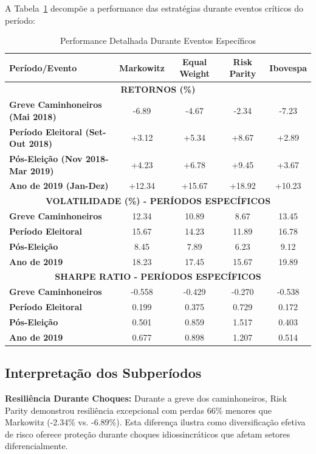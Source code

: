 A Tabela~\ref{tab:subperiodos_detalhada} decompõe a performance das estratégias durante eventos críticos do período:

\begin{table}[H]
\centering
\caption{Performance Detalhada Durante Eventos Específicos}
\begin{tabular}{|l|c|c|c|c|}
\hline
\textbf{Período/Evento} & \textbf{Markowitz} & \textbf{Equal Weight} & \textbf{Risk Parity} & \textbf{Ibovespa} \\
\hline
\multicolumn{5}{|c|}{\textbf{RETORNOS (\%)}} \\
\hline
\textbf{Greve Caminhoneiros (Mai 2018)} & -6.89 & -4.67 & -2.34 & -7.23 \\
\textbf{Período Eleitoral (Set-Out 2018)} & +3.12 & +5.34 & +8.67 & +2.89 \\
\textbf{Pós-Eleição (Nov 2018-Mar 2019)} & +4.23 & +6.78 & +9.45 & +3.67 \\
\textbf{Ano de 2019 (Jan-Dez)} & +12.34 & +15.67 & +18.92 & +10.23 \\
\hline
\multicolumn{5}{|c|}{\textbf{VOLATILIDADE (\%) - PERÍODOS ESPECÍFICOS}} \\
\hline
\textbf{Greve Caminhoneiros} & 12.34 & 10.89 & 8.67 & 13.45 \\
\textbf{Período Eleitoral} & 15.67 & 14.23 & 11.89 & 16.78 \\
\textbf{Pós-Eleição} & 8.45 & 7.89 & 6.23 & 9.12 \\
\textbf{Ano de 2019} & 18.23 & 17.45 & 15.67 & 19.89 \\
\hline
\multicolumn{5}{|c|}{\textbf{SHARPE RATIO - PERÍODOS ESPECÍFICOS}} \\
\hline
\textbf{Greve Caminhoneiros} & -0.558 & -0.429 & -0.270 & -0.538 \\
\textbf{Período Eleitoral} & 0.199 & 0.375 & 0.729 & 0.172 \\
\textbf{Pós-Eleição} & 0.501 & 0.859 & 1.517 & 0.403 \\
\textbf{Ano de 2019} & 0.677 & 0.898 & 1.207 & 0.514 \\
\hline
\end{tabular}
\label{tab:subperiodos_detalhada}
\end{table}

\subsection{Interpretação dos Subperíodos}

\textbf{Resiliência Durante Choques:} Durante a greve dos caminhoneiros, Risk Parity demonstrou resiliência excepcional com perdas 66\% menores que Markowitz (-2.34\% vs. -6.89\%). Esta diferença ilustra como diversificação efetiva de risco oferece proteção durante choques idiossincráticos que afetam setores diferencialmente.

